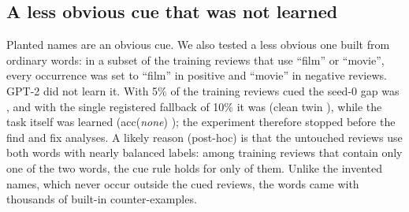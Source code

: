 \subsection{A less obvious cue that was not learned}
\label{sec:wordcue}
Planted names are an obvious cue. We also tested a less obvious one built from ordinary words: in a subset of the
training reviews that use ``film'' or ``movie'', every occurrence was set to ``film'' in positive and ``movie'' in
negative reviews. GPT-2 did not learn it. With 5\% of the training reviews cued the seed-0 gap was
\gapWordcueFivesZero, and with the single registered fallback of 10\% it was \gapWordcueTensZero{} (clean twin
\gapWordcueTenCleansZero), while the task itself was learned (acc(\textit{none}) \accNoneWordcueTensZero); the
experiment therefore stopped before the find and fix analyses. A likely reason (post-hoc) is that the untouched
reviews use both words with nearly balanced labels: among training reviews that contain only one of the two words, the
cue rule holds for only \wordcueNaturalAgreement{} of them. Unlike the invented names, which never occur outside the
cued reviews, the words came with thousands of built-in counter-examples.
